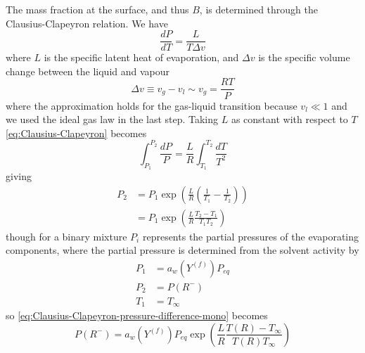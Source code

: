 \documentclass[11pt,twoside]{report}
\begin{document}
The mass fraction at the surface, and thus $B$, is determined through the Clausius-Clapeyron relation.
We have
\begin{equation}\label{eq:Clausius-Clapeyron}
  \frac{d P}{dT} = \frac{L}{T \Delta v}
\end{equation}
where $L$ is the specific latent heat of evaporation, and $\Delta v$ is the specific volume change between the liquid and vapour
\begin{equation}
  \Delta v
  \equiv v_g - v_l
  \sim v_g
  = \frac{RT}{P}
\end{equation}
where the approximation holds for the gas-liquid transition because $v_l \ll 1$ and we used the ideal gas law in the last step.
Taking $L$ as constant with respect to $T$ \eqref{eq:Clausius-Clapeyron} becomes
\begin{equation}
  \int_{P_1}^{P_2} \frac{d P}{P} =
  \frac{L}{R} \int_{T_1}^{T_2} \frac{dT}{T^2}
\end{equation}
giving
\begin{equation}\label{eq:Clausius-Clapeyron-pressure-difference-mono}
  \begin{aligned}
    P_2 &=
    P_1 \exp{\left( \frac{L}{R} \left(\frac{1}{T_1} - \frac{1}{T_2} \right) \right)} \\
    &=
    P_1 \exp{\left( \frac{L}{R} \frac{T_2 - T_1}{T_1 T_2} \right)}
  \end{aligned}
\end{equation}
though for a binary mixture $P_i$ represents the partial pressures of the evaporating components,
where the partial pressure is determined from the solvent activity by
\begin{subequations}
  \begin{align}
    P_1 &= a_w(Y^{(f)}) P_{eq} \\
    P_2 &= P(R^-) \\
    T_1 &= T_\infty
  \end{align}
\end{subequations}
so \eqref{eq:Clausius-Clapeyron-pressure-difference-mono} becomes
\begin{equation}\label{eq:Clausius-Clapeyron-pressure-difference-binary}
  P(R^-) =
  a_w(Y^{(f)}) P_{eq}
  \exp{\left( \frac{L}{R} \frac{T(R) - T_\infty}{T(R) T_\infty} \right)}
\end{equation}
\end{document}
